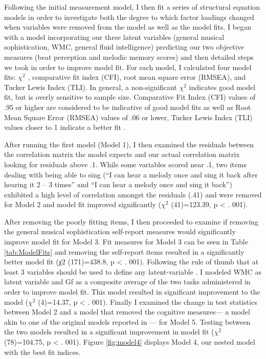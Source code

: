 \documentclass[12pt,]{book}
\begin{document}
Following the initial measurement model, I then fit a series of structural equation models in order to investigate both the degree to which factor loadings changed when variables were removed from the model as well as the model fits.
I began with a model incorporating our three latent variables (general musical sophistication, WMC, general fluid intelligence) predicting our two objective measures (beat perception and melodic memory scores) and then detailed steps we took in order to improve model fit.
For each model, I calculated four model fits: \(\chi^2\) , comparative fit index (CFI), root mean square error (RMSEA), and Tucker Lewis Index (TLI).
In general, a non-significant \(\chi^2\) indicates good model fit, but is overly sensitive to sample size.
Comparative Fit Index (CFI) values of .95 or higher are considered to be indicative of good model fits as well as Root Mean Square Error (RMSEA) values of .06 or lower, Tucker Lewis Index (TLI) values closer to 1 indicate a better fit \citep{beaujeanLatentVariableModeling2014}.

After running the first model (Model 1), I then examined the residuals between the correlation matrix the model expects and our actual correlation matrix looking for residuals above .1.
While some variables scored near .1, two items dealing with being able to sing (``I can hear a melody once and sing it back after hearing it 2 -- 3 times'' and ``I can hear a melody once and sing it back'') exhibited a high level of correlation amongst the residuals (.41) and were removed for Model 2 and model fit improved significantly (\(\chi^2\) (41)=123.39, p \textless{} . 001).

After removing the poorly fitting items, I then proceeded to examine if removing the general musical sophistication self-report measures would significantly improve model fit for Model 3.
Fit measures for Model 3 can be seen in Table \ref{tab:ModelFits} and removing the self-report items resulted in a significantly better model fit (χ2 (171)=438.8, p \textless{} . 001).
Following the rule of thumb that at least 3 variables should be used to define any latent-variable \citep{beaujeanLatentVariableModeling2014}.
I modeled WMC as latent variable and Gf as a composite average of the two tasks administered in order to improve model fit.
This model resulted in significant improvement to the model (\(\chi^2\) (4)=14.37, p \textless{} . 001).
Finally I examined the change in test statistics between Model 2 and a model that removed the cognitive measures--- a model akin to one of the original models reported in \citep{mullensiefenMusicalityNonMusiciansIndex2014}--- for Model 5.
Testing between the two models resulted in a significant improvement in model fit (\(\chi^2\) (78)=104.75, p \textless{} . 001).
Figure \ref{fig:model4} displays Model 4, our nested model with the best fit indices.
\end{document}
